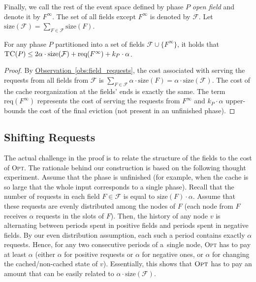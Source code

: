 \documentclass[sigconf,screen=true]{acmart}
\newcommand{\lref}[2][]{\hyperref[#2]{#1~\ref*{#2}}}
\newcommand{\ALG}{\textsc{TC}\xspace}
\newcommand{\OPT}{\textsc{Opt}\xspace}
\newcommand{\size}{\textrm{size}}
\newcommand{\req}{\textrm{req}}
\newcommand{\F}{\mathcal{F}}
\begin{document}
Finally, we call the rest of the event space defined by phase $P$
\emph{open field} and denote it by $F^\infty$. The set of all fields except $
F^\infty$ is denoted by $\F$. Let $\size(\F) = \sum_{F \in \F} \size(F)$.

\begin{lemma}
\label{lem:alg_cost}
For any phase $P$ partitioned into a set of fields $\F \cup \{ F^\infty \}$,
it holds that $\ALG(P) \leq 2 \alpha \cdot \size(\F) + \req(F^\infty) + k_P
\cdot \alpha$.
\end{lemma}

\begin{proof}
By \lref[Observation]{obs:field_requests}, the cost associated with serving
the requests from all fields from $\mathcal{F}$ is $\sum_{F \in \F} \alpha
\cdot \size(F) = \alpha \cdot \size(\F)$. The cost of the cache reorganization
at the fields' ends is exactly the same. The term $\req(F^\infty)$ represents
the cost of serving the requests from $F^\infty$ and $k_P \cdot \alpha$
upper-bounds the cost of the final eviction (not present in an unfinished
phase).
\end{proof}



\subsection{Shifting Requests}\label{sec:shifting}

The actual challenge in the proof is to relate the structure of the fields to
the cost of {\OPT}. The rationale behind our construction is based on the
following thought experiment. Assume that the phase is unfinished (for
example, when the cache is so large that the whole input corresponds to a
single phase). Recall that the number of requests in each field $F \in \F$ is
equal to $\size(F) \cdot \alpha$. Assume that these requests are evenly
distributed among the nodes of $F$ (each node from $F$ receives $\alpha$
requests in the slots of $F$). Then, the history of any node $v$ is
alternating between periods spent in positive fields and periods spent in
negative fields. By our even distribution assumption, each such a period
contains exactly $\alpha$ requests. Hence, for any two consecutive periods of
a~single node, \OPT has to pay at least $\alpha$ (either $\alpha$ for positive
requests or $\alpha$ for negative ones, or $\alpha$ for changing the
cached/non-cached state of $v$). Essentially, this shows that $\OPT$ has to
pay an amount that can be easily related to $\alpha \cdot
\size(\F)$.
\end{document}

